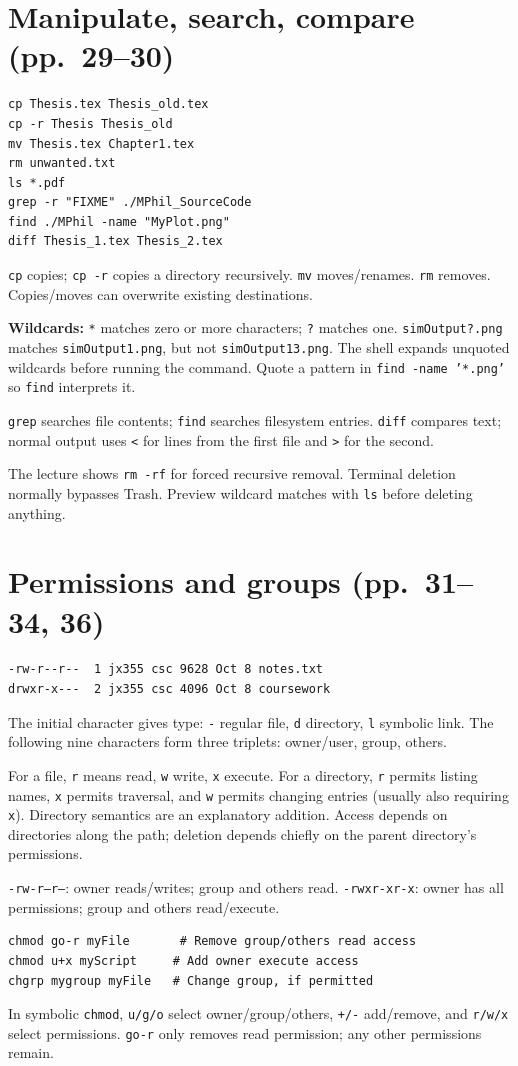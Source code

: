 \documentclass[11pt,a4paper]{article}
\begin{document}
\section{Manipulate, search, compare (pp.~29--30)}
\begin{lstlisting}
cp Thesis.tex Thesis_old.tex
cp -r Thesis Thesis_old
mv Thesis.tex Chapter1.tex
rm unwanted.txt
ls *.pdf
grep -r "FIXME" ./MPhil_SourceCode
find ./MPhil -name "MyPlot.png"
diff Thesis_1.tex Thesis_2.tex
\end{lstlisting}
\texttt{cp} copies; \texttt{cp -r} copies a directory recursively. \texttt{mv} moves/renames. \texttt{rm} removes. Copies/moves can overwrite existing destinations.

\textbf{Wildcards:} \texttt{*} matches zero or more characters; \texttt{?} matches one. \texttt{simOutput?.png} matches \texttt{simOutput1.png}, but not \texttt{simOutput13.png}. The shell expands unquoted wildcards before running the command. Quote a pattern in \texttt{find -name '*.png'} so \texttt{find} interprets it.

\texttt{grep} searches file contents; \texttt{find} searches filesystem entries. \texttt{diff} compares text; normal output uses \texttt{<} for lines from the first file and \texttt{>} for the second.

The lecture shows \texttt{rm -rf} for forced recursive removal. Terminal deletion normally bypasses Trash. Preview wildcard matches with \texttt{ls} before deleting anything.
\section{Permissions and groups (pp.~31--34, 36)}
\begin{lstlisting}
-rw-r--r--  1 jx355 csc 9628 Oct 8 notes.txt
drwxr-x---  2 jx355 csc 4096 Oct 8 coursework
\end{lstlisting}
The initial character gives type: \texttt{-} regular file, \texttt{d} directory, \texttt{l} symbolic link. The following nine characters form three triplets: owner/user, group, others.

For a file, \texttt{r} means read, \texttt{w} write, \texttt{x} execute. For a directory, \texttt{r} permits listing names, \texttt{x} permits traversal, and \texttt{w} permits changing entries (usually also requiring \texttt{x}). Directory semantics are an explanatory addition. Access depends on directories along the path; deletion depends chiefly on the parent directory's permissions.

\texttt{-rw-r--r--}: owner reads/writes; group and others read. \texttt{-rwxr-xr-x}: owner has all permissions; group and others read/execute.
\begin{lstlisting}
chmod go-r myFile       # Remove group/others read access
chmod u+x myScript     # Add owner execute access
chgrp mygroup myFile   # Change group, if permitted
\end{lstlisting}
In symbolic \texttt{chmod}, \texttt{u/g/o} select owner/group/others, \texttt{+/-} add/remove, and \texttt{r/w/x} select permissions. \texttt{go-r} only removes read permission; any other permissions remain.
\end{document}
